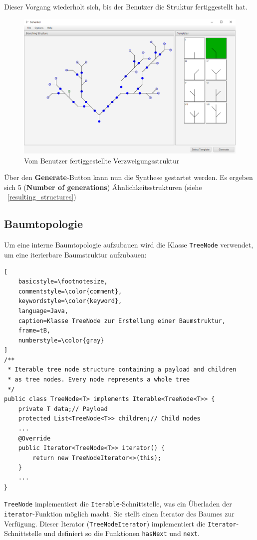 Dieser Vorgang wiederholt sich, bis der Benutzer die Struktur fertiggestellt hat.
\begin{figure}[H]
    \centering
    \includegraphics[width=13cm]{../images/UI_finished.png}
    \caption{Vom Benutzer fertiggestellte Verzweigungsstruktur}
\end{figure}

Über den \textbf{Generate}-Button kann nun die Synthese gestartet werden.
Es ergeben sich 5 (\textbf{Number of generations}) Ähnlichkeitsstrukturen
(siehe ~\ref{resulting_structures})

\subsection*{Baumtopologie}
Um eine interne Baumtopologie aufzubauen wird die Klasse \texttt{TreeNode} verwendet, um eine iterierbare Baumstruktur
aufzubauen:

\newpage

\begin{lstlisting}[
    basicstyle=\footnotesize,
    commentstyle=\color{comment},
    keywordstyle=\color{keyword},
    language=Java,
    caption=Klasse TreeNode zur Erstellung einer Baumstruktur,
    frame=tB,
    numberstyle=\color{gray}
]
/**
 * Iterable tree node structure containing a payload and children
 * as tree nodes. Every node represents a whole tree
 */
public class TreeNode<T> implements Iterable<TreeNode<T>> {
    private T data;// Payload
    protected List<TreeNode<T>> children;// Child nodes
    ...
    @Override
    public Iterator<TreeNode<T>> iterator() {
        return new TreeNodeIterator<>(this);
    }
    ...
}
\end{lstlisting}

\texttt{TreeNode} implementiert die \texttt{Iterable}-Schnittstelle, was ein Überladen der \texttt{iterator}-Funktion möglich
macht.
Sie stellt einen Iterator des Baumes zur Verfügung.
Dieser Iterator (\texttt{TreeNodeIterator}) implementiert die \texttt{Iterator}-Schnittstelle und definiert so die Funktionen
\texttt{hasNext} und \texttt{next}.

